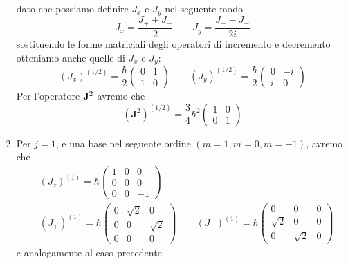 \begin{enumerate}
dato che possiamo definire $J_x$ e $J_y$ nel seguente modo
\begin{equation*}
J_x = \frac{J_+ +J_-}{2} \quad \quad J_y = \frac{J_+ - J_-}{2i}
\end{equation*}
sostituendo le forme matriciali degli operatori di incremento e decremento otteniamo anche quelle di $J_x$ e $J_y$:
\begin{equation*}
	\left(J_x\right)^{(1 / 2)}=\frac{\hbar}{2}\left(\begin{array}{cc}
0 & 1 \\
1 & 0
\end{array}\right) \quad \quad \left(J_y\right)^{(1 / 2)}=\frac{\hbar}{2}\left(\begin{array}{cc}
0 & -i \\
i & 0
\end{array}\right)
\end{equation*}
\newpage
Per l'operatore $\bold{J}^2$ avremo che 
\begin{equation*}
	\left(\mathbf{J}^2\right)^{(1 / 2)}=\frac{3}{4} \hbar^2\left(\begin{array}{ll}
1 & 0 \\
0 & 1
\end{array}\right)
\end{equation*}
\item Per $j = 1 $, e una base nel seguente ordine $(m=1,m=0,m=-1)$, avremo che 
\begin{equation*}
\begin{aligned}
& \left(J_z\right)^{(1)}=\hbar\left(\begin{array}{ccc}
1 & 0 & 0 \\
0 & 0 & 0 \\
0 & 0 & -1
\end{array}\right) \\[0.6cm]
& \left(J_{+}\right)^{(1)}=\hbar\left(\begin{array}{ccc}
0 & \sqrt{2} & 0 \\
0 & 0 & \sqrt{2} \\
0 & 0 & 0
\end{array}\right) \quad \quad \left(J_{-}\right)^{(1)}=\hbar\left(\begin{array}{ccc}
0 & 0 & 0 \\
\sqrt{2} & 0 & 0 \\
0 & \sqrt{2} & 0
\end{array}\right)
\end{aligned}
\end{equation*}
e analogamente al caso precedente 

\end{enumerate}
